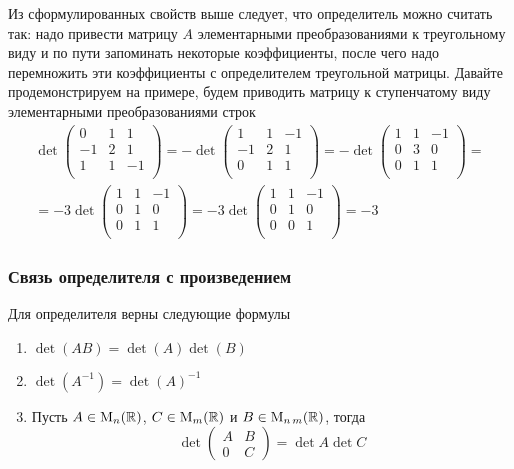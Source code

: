 \documentclass{article}
\begin{document}
Из сформулированных свойств выше следует, что определитель можно считать так: надо привести матрицу $A$ элементарными преобразованиями к треугольному виду и по пути запоминать некоторые коэффициенты, после чего надо перемножить эти коэффициенты с определителем треугольной матрицы. Давайте продемонстрируем на примере, будем приводить матрицу к ступенчатому виду элементарными преобразованиями строк
\begin{gather*}
	\det
	\begin{pmatrix}
		{0}&{1}&{1}\\
		{-1}&{2}&{1}\\
		{1}&{1}&{-1}\\
	\end{pmatrix}
	=
	-
	\det
	\begin{pmatrix}
		{1}&{1}&{-1}\\
		{-1}&{2}&{1}\\
		{0}&{1}&{1}\\
	\end{pmatrix}
	=
	-\det
	\begin{pmatrix}
		{1}&{1}&{-1}\\
		{0}&{3}&{0}\\
		{0}&{1}&{1}\\
	\end{pmatrix}
	=\\=
	-3
	\det
	\begin{pmatrix}
		{1}&{1}&{-1}\\
		{0}&{1}&{0}\\
		{0}&{1}&{1}\\
	\end{pmatrix}
	=-3
	\det
	\begin{pmatrix}
		{1}&{1}&{-1}\\
		{0}&{1}&{0}\\
		{0}&{0}&{1}\\
	\end{pmatrix}
	=-3
\end{gather*}


\subsubsection*{Связь определителя с произведением}

Для определителя верны следующие формулы
\begin{enumerate}
	\item $\det(AB) = \det(A) \det(B)$
	
	\item $\det(A^{-1}) = \det(A)^{-1}$
	
	\item Пусть $A\in \operatorname{M}_{n}(\mathbb R)$, $C\in \operatorname{M}_{m}(\mathbb R)$ и $B\in \operatorname{M}_{n\,m}(\mathbb R)$, тогда
	\[
	\det
	\begin{pmatrix}
		{A}&{B}\\
		{0}&{C}
	\end{pmatrix}
	=
	\det A \det C
	\]
\end{enumerate}
\end{document}
